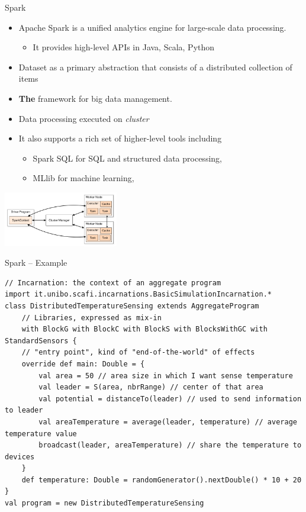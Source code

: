 \documentclass[presentation, 9pt]{beamer}\mode<presentation>{\usetheme{AMSBolognaFC}}
\begin{document}
\begin{frame}{Spark}
	\begin{itemize}
		\item Apache Spark is a unified analytics engine for large-scale data processing.
		\begin{itemize}
			\item It provides high-level APIs in Java, Scala, Python
		\end{itemize}
		\item Dataset as a primary abstraction that consists of a distributed collection of items 
  	\item \textbf{The} framework for big data management.
   \item Data processing executed on \emph{cluster}
   	\item It also supports a rich set of higher-level tools including 
		 \begin{itemize}
			\item Spark SQL for SQL and structured data processing, 
   		\item MLlib for machine learning,  
		 \end{itemize}
	\end{itemize}
	\centering
	\includegraphics[width=5cm]{img/cluster-overview.png}
\end{frame}
\begin{frame}[fragile]{Spark -- Example}
	\begin{alertblock}{}
		\begin{tcolorbox}[left=0pt, top=0pt, bottom=0pt]
			\begin{verbatim}
// Incarnation: the context of an aggregate program
import it.unibo.scafi.incarnations.BasicSimulationIncarnation.*
class DistributedTemperatureSensing extends AggregateProgram
	// Libraries, expressed as mix-in
	with BlockG with BlockC with BlockS with BlocksWithGC with StandardSensors { 
	// "entry point", kind of "end-of-the-world" of effects
	override def main: Double = {
		val area = 50 // area size in which I want sense temperature
		val leader = S(area, nbrRange) // center of that area
		val potential = distanceTo(leader) // used to send information to leader
		val areaTemperature = average(leader, temperature) // average temperature value
		broadcast(leader, areaTemperature) // share the temperature to devices
	}
	def temperature: Double = randomGenerator().nextDouble() * 10 + 20
}
val program = new DistributedTemperatureSensing
			\end{verbatim}
		\end{tcolorbox}
	\end{alertblock}
\end{frame}
\end{document}
